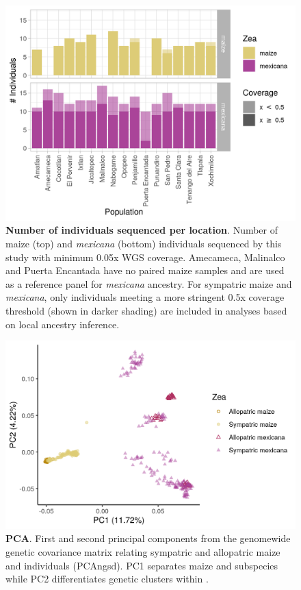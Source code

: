 \begin{figure}[ht]
	\includegraphics[width=\textwidth]{chapter2/figures/p_seq_counts.png}
	\caption{\color{Gray} \textbf{Number of individuals sequenced per location}. Number of maize (top) and \textit{mexicana} (bottom) individuals sequenced by this study with minimum 0.05x WGS coverage. Amecameca, Malinalco and Puerta Encantada have no paired maize samples and are used as a reference panel for \textit{mexicana} ancestry. For sympatric maize and \textit{mexicana}, only individuals meeting a more stringent 0.5x coverage threshold (shown in darker shading) are included in analyses based on local ancestry inference.}
	\label{sequenced_ind_counts}
\end{figure}

\begin{figure}[ht]
\includegraphics[width=\textwidth]{chapter2/figures/HILO_MAIZE55_pca.png}
\caption{\color{Gray} \textbf{PCA}. First and second principal components from the genomewide genetic covariance matrix relating sympatric and allopatric maize and \mexicana individuals (PCAngsd). PC1 separates maize and \mexicana subspecies while PC2 differentiates genetic clusters within \mexicana.}
\label{pca_maize_mex}
\end{figure}

